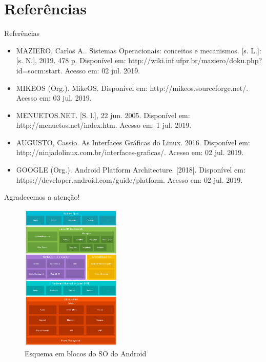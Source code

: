 \documentclass{beamer}
\begin{document}
  \section{Referências}
    \begin{frame}{Referências}
      \begin{itemize}
        \item MAZIERO, Carlos A.. Sistemas Operacionais: conceitos e mecanismos. [s. L.]: [s. N.], 2019. 478 p. Disponível em: http://wiki.inf.ufpr.br/maziero/doku.php?id=socm:start. Acesso em: 02 jul. 2019.
        \item MIKEOS (Org.). MikeOS. Disponível em: http://mikeos.sourceforge.net/. Acesso em: 03 jul. 2019.
        \item MENUETOS.NET. [S. l.], 22 jun. 2005. Disponível em: http://menuetos.net/index.htm. Acesso em: 1 jul. 2019.
        \item AUGUSTO, Cassio. As Interfaces Gráficas do Linux. 2016. Disponível em: http://ninjadolinux.com.br/interfaces-graficas/. Acesso em: 02 jul. 2019.
        \item GOOGLE (Org.). Android Platform Architecture. [2018]. Disponível em: https://developer.android.com/guide/platform. Acesso em: 02 jul. 2019.
      \end{itemize}
    \end{frame}
  
    \begin{frame}{Agradecemos a atenção!}
      \begin{figure}[!htb]
        \centering
        \includegraphics[height=200pt, keepaspectratio=true]{figuras/fundamentos/TheAndroidSoftwareStack.png}
        \caption{Esquema em blocos do SO do Android}
        \label{The Android software stack}
      \end{figure}
    \end{frame}
\end{document}
